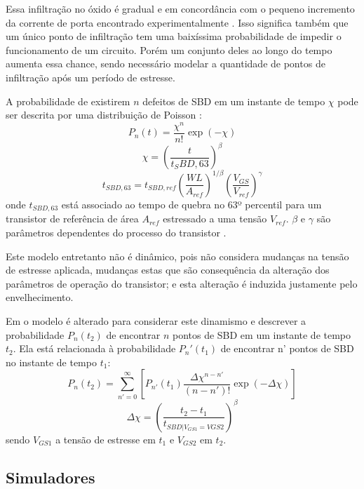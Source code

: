 Essa infiltração no óxido é gradual e em concordância com o pequeno incremento da corrente de porta encontrado experimentalmente \cite{Sahhaf2009}. Isso significa também que um único ponto de infiltração tem uma baixíssima probabilidade de impedir o funcionamento de um circuito. Porém um conjunto deles ao longo do tempo aumenta essa chance, sendo necessário modelar a quantidade de pontos de infiltração após um período de estresse.

A probabilidade de existirem $n$ defeitos de SBD em um instante de tempo $\chi$ pode ser descrita por uma distribuição de Poisson \cite{Wu2005}:
\begin{equation}
P_n(t)=\frac{\chi^n}{n!}\exp(-\chi)
\end{equation}
\begin{equation}
\chi = \left(\frac{t}{t_SBD,63} \right)^\beta
\end{equation}
\begin{equation}
t_{SBD,63} = t_{SBD,ref} \left(\frac{WL}{A_{ref}}\right)^{1/\beta}\left(\frac{V_{GS}}{V_{ref}}\right)^\gamma
\end{equation}
onde $t_{SBD,63}$ está associado ao tempo de quebra no 63º percentil para um transistor de referência de área $A_{ref}$ estressado a uma tensão $V_{ref}$. $\beta$ e $\gamma$ são parâmetros dependentes do processo do transistor \cite{Sahhaf2009}.

Este modelo entretanto não é dinâmico, pois não considera mudanças na tensão de estresse aplicada, mudanças estas que são consequência da alteração dos parâmetros de operação do transistor; e esta alteração é induzida justamente pelo envelhecimento.

Em \cite{Maricau2013} o modelo é alterado para considerar este dinamismo e descrever a probabilidade $P_n(t_2)$ de encontrar $n$ pontos de SBD em um instante de tempo $t_2$. Ela está relacionada à probabilidade $P_n'(t_1)$ de encontrar n' pontos de SBD no instante de tempo $t_1$:
\begin{equation}
P_n(t_2)=\sum_{n'=0}^{\infty}\left[P_{n'}(t_1)\frac{\Delta \chi^{n-n'}}{(n-n')!}\exp(-\Delta\chi) \right]
\end{equation}
\begin{equation}
\Delta\chi = \left(\frac{t_2-t_1}{t_{SBD|V_{GS1}=V{GS2}}} \right)^\beta
\end{equation}
sendo $V_{GS1}$ a tensão de estresse em $t_1$ e $V_{GS2}$ em $t_2$.
\subsection{Simuladores}
\label{subsection_Simuladores}

